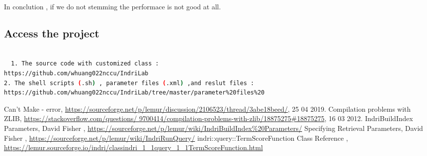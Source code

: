 \documentclass{article}
\begin{document}
In conclution , if we do not stemming the performace is not good at all.

\subsection{Access the project}


\begin{lstlisting}[language=bash,caption={Access the project }]

  1. The source code with customized class : 
https://github.com/whuang022nccu/IndriLab 
2. The shell scripts (.sh) , parameter files (.xml) ,and reslut files : 
https://github.com/whuang022nccu/IndriLab/tree/master/parameter%20files%20 
  \end{lstlisting}


\newpage
\begin{thebibliography}{99}  
  Can't Make - error, \url{https://sourceforge.net/p/lemur/discussion/2106523/thread/3abe18beed/}, 25 04 2019.
  Compilation problems with ZLIB, \url{https://stackoverflow.com/questions/
  9700414/compilation-problems-with-zlib/18875275#18875275}, 16 03 2012.
  IndriBuildIndex Parameters, David Fisher , \url{https://sourceforge.net/p/lemur/wiki/IndriBuildIndex%20Parameters/}
  Specifying Retrieval Parameters, David Fisher , \url{https://sourceforge.net/p/lemur/wiki/IndriRunQuery/}
  indri::query::TermScoreFunction Class Reference , \url{https://lemur.sourceforge.io/indri/classindri_1_1query_1_1TermScoreFunction.html}

 
\end{thebibliography}
\end{document}
